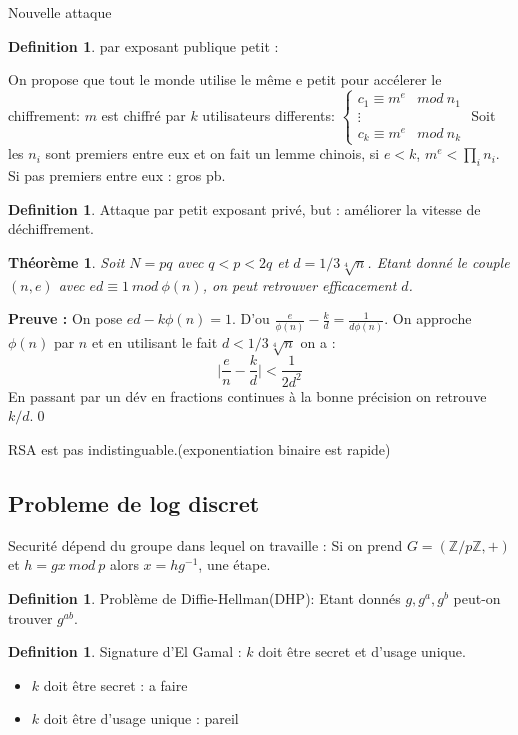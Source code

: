 \documentclass[12pt]{article}
\theoremstyle{plain}
\newtheorem{thm}[subsubsection]{Th\'eor\`eme}
\theoremstyle{definition}
\newtheorem{defn}[subsubsection]{Definition}
\newcommand{\Z}{\mathbb{Z}}
\begin{document}
Nouvelle attaque 
\begin{defn}
    par exposant publique petit :
\end{defn}
On propose que tout le monde utilise le même e petit pour accélerer le chiffrement: 
$m$ est chiffré par $k$ utilisateurs differents:
$
\begin{cases}
    c_1\equiv m^e &mod~n_1\\
    \vdots&\\
    c_k\equiv m^e &mod~n_k
\end{cases}
$
Soit les $n_i$ sont premiers entre eux et on fait un lemme chinois, si $e<k$, $m^e<\prod_i n_i$.
Si pas premiers entre eux : gros pb.\\
\begin{defn}
    Attaque par petit exposant privé, but : améliorer la vitesse de déchiffrement.
\end{defn}
\begin{thm}
    Soit $N=pq$ avec $q<p<2q$ et $d=1/3\sqrt[4]{n}$. Etant donné le couple $(n,e)$ avec $ed\equiv1~mod~\phi(n)$, on peut
    retrouver efficacement $d$.
\end{thm}
\noindent\textbf{Preuve :} On pose $ed-k\phi(n)=1$. D'ou $\frac{e}{\phi(n)}-\frac{k}{d}=\frac{1}{d\phi(n)}$.
On approche $\phi(n)$ par $n$ et en utilisant le fait $d<1/3\sqrt[4]{n}$ on a :
$$\lvert \frac{e}{n}-\frac{k}{d}\rvert<\frac{1}{2d^2}$$
En passant par un dév en fractions continues à la bonne précision on retrouve $k/d$.\qed

RSA est pas indistinguable.(exponentiation binaire est rapide)

\subsection{Probleme de log discret}
Securité dépend du groupe dans lequel on travaille : Si on prend $G=(\Z/p\Z,+)$ et $h=gx~mod~p$ alors $x=hg^{-1}$, une étape.
\begin{defn}
    Problème de Diffie-Hellman(DHP): Etant donnés $g,g^a,g^b$ peut-on trouver $g^{ab}$.
\end{defn}

\begin{defn}
    Signature d'El Gamal : $k$ doit être secret et d'usage unique.
\end{defn}
\begin{itemize}
    \item $k$ doit être secret : a faire
    \item $k$ doit être d'usage unique : pareil
\end{itemize}
\end{document}
